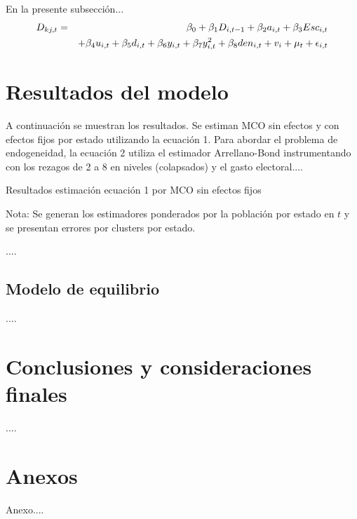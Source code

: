 \documentclass[11pt]{article}
\begin{document}
En la presente subsección...
%
\begin{eqnarray}
D_{kj,t} &=&\beta_0 + \beta_1 D_{i,t-1} + \beta_2 a_{i,t} + \beta_3 Esc_{i,t}  \notag \\
 &&+ \beta_4 u_{i,t}  + \beta_5 d_{i,t}   + \beta_6 y_{i,t}  + \beta_7 y^2_{i,t}  + \beta_8 den_{i,t}  + v_{i} +  \mu_t  +\epsilon_{i,t} 
\end{eqnarray}
%
\section{Resultados del modelo}


A continuación se muestran los resultados. Se estiman MCO sin efectos y con efectos fijos por estado utilizando la ecuación 1. Para abordar el problema de endogeneidad, la ecuación 2 utiliza el estimador Arrellano-Bond instrumentando con los rezagos de 2 a 8 en niveles (colapsados) y el gasto electoral....


\begin{table}[H]
\begin{center}
\caption{Resultados estimación ecuación 1 por MCO sin efectos fijos}
\resizebox{6.5in}{!}{
}
\end{center}
\begin{tiny}
Nota: Se generan los estimadores ponderados por la población por estado en $t$ y se presentan errores por clusters por estado.
\end{tiny}
\end{table}

....


\subsection{Modelo de equilibrio}

....

\section{Conclusiones y consideraciones finales}

....





\pagebreak

\renewcommand{\refname}{Bibliografía}





\newpage


\newpage
{}
\appendix    

\section*{Anexos} 
Anexo....
\end{document}
